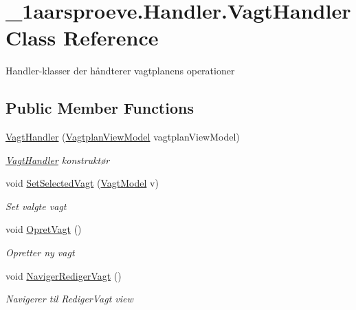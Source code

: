 \hypertarget{class__1aarsproeve_1_1_handler_1_1_vagt_handler}{}\section{\+\_\+1aarsproeve.\+Handler.\+Vagt\+Handler Class Reference}
\label{class__1aarsproeve_1_1_handler_1_1_vagt_handler}


Handler-\/klasser der håndterer vagtplanens operationer  


\subsection*{Public Member Functions}
\begin{DoxyCompactItemize}
\item 
\hyperlink{class__1aarsproeve_1_1_handler_1_1_vagt_handler_a030580ed58226bf1741303da667a7954}{Vagt\+Handler} (\hyperlink{class__1aarsproeve_1_1_view_model_1_1_vagtplan_view_model}{Vagtplan\+View\+Model} vagtplan\+View\+Model)
\begin{DoxyCompactList}\small\item\em \hyperlink{class__1aarsproeve_1_1_handler_1_1_vagt_handler}{Vagt\+Handler} konstruktør \end{DoxyCompactList}\item 
void \hyperlink{class__1aarsproeve_1_1_handler_1_1_vagt_handler_abf4cc3d85dcf76f1bc7b97232e7b3337}{Set\+Selected\+Vagt} (\hyperlink{class__1aarsproeve_1_1_model_1_1_vagt_model}{Vagt\+Model} v)
\begin{DoxyCompactList}\small\item\em Set valgte vagt \end{DoxyCompactList}\item 
void \hyperlink{class__1aarsproeve_1_1_handler_1_1_vagt_handler_a1fd83f7cf36110449f308ed5d0029935}{Opret\+Vagt} ()
\begin{DoxyCompactList}\small\item\em Opretter ny vagt \end{DoxyCompactList}\item 
void \hyperlink{class__1aarsproeve_1_1_handler_1_1_vagt_handler_a31b87d5032e283af1a0aca6c957c9d30}{Naviger\+Rediger\+Vagt} ()
\begin{DoxyCompactList}\small\item\em Navigerer til Rediger\+Vagt view \end{DoxyCompactList}\item 

\end{DoxyCompactItemize}
